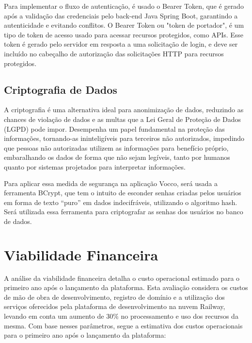 Para implementar o fluxo de autenticação, é usado o Bearer Token, que é gerado após a validação das credenciais pelo back-end Java Spring Boot, garantindo a autenticidade e evitando conflitos.
O Bearer Token ou "token de portador", é um tipo de token de acesso usado para acessar recursos protegidos, como APIs. Esse token é gerado pelo servidor em resposta a uma solicitação de login, e deve ser incluído no cabeçalho de autorização das solicitações HTTP para recursos protegidos.


\subsection{Criptografia de Dados}
A criptografia é uma alternativa ideal para anonimização de dados, reduzindo as chances de violação de dados e as multas que a Lei Geral de Proteção de Dados (LGPD) pode impor. Desempenha um papel fundamental na proteção das informações, tornando-as ininteligíveis para terceiros não autorizados, impedindo que pessoas não autorizadas utilizem as informações para benefício próprio, embaralhando os dados de forma que não sejam legíveis, tanto por humanos quanto por sistemas projetados para interpretar informações.

Para aplicar essa medida de segurança na aplicação Vocco, será usada a ferramenta BCrypt, que tem o intuito de esconder senhas criadas pelos usuários em forma de texto “puro” em dados indecifráveis, utilizando o algoritmo hash.
Será utilizada essa ferramenta para criptografar as senhas dos usuários no banco de dados. 



\section{Viabilidade Financeira}
A análise da viabilidade financeira detalha o custo operacional estimado para o primeiro ano após o lançamento da plataforma. Esta avaliação considera os custos de mão de obra de desenvolvimento, registro de domínio e a utilização dos serviços oferecidos pela plataforma de desenvolvimento na nuvem Railway, levando em conta um aumento de 30\% no processamento e uso dos recursos da mesma. Com base nesses parâmetros, segue a estimativa dos custos operacionais para o primeiro ano após o lançamento da plataforma:

